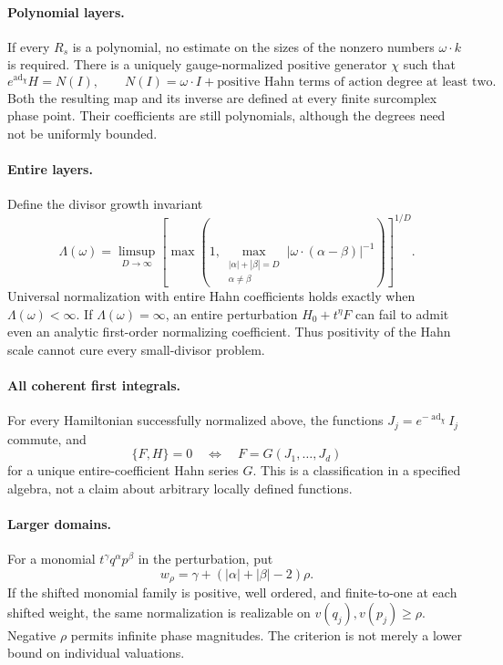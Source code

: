 \documentclass[11pt,letterpaper]{article}
\numberwithin{equation}{section}
\theoremstyle{definition}
\theoremstyle{remark}
\newcommand{\ad}{\operatorname{ad}}
\begin{document}
\paragraph{Polynomial layers.}
If every $R_s$ is a polynomial, no estimate on the sizes of the nonzero
numbers $\omega\cdot k$ is required. There is a uniquely gauge-normalized
positive generator $\chi$ such that
\[
 e^{\ad_\chi}H=N(I),\qquad
 N(I)=\omega\cdot I+\text{positive Hahn terms of action degree at least two}.
\]
Both the resulting map and its inverse are defined at every finite
surcomplex phase point. Their coefficients are still polynomials, although
the degrees need not be uniformly bounded.

\paragraph{Entire layers.}
Define the divisor growth invariant
\begin{equation}\label{eq:Lambdaintro}
 \Lambda(\omega)=\limsup_{D\to\infty}
 \left[\max\left(1,
 \max_{\substack{|\alpha|+|\beta|=D\\\alpha\ne\beta}}
 |\omega\cdot(\alpha-\beta)|^{-1}\right)\right]^{1/D}.
\end{equation}
Universal normalization with entire Hahn coefficients holds exactly when
$\Lambda(\omega)<\infty$. If $\Lambda(\omega)=\infty$, an entire perturbation
$H_0+t^\eta F$ can fail to admit even an analytic first-order normalizing
coefficient. Thus positivity of the Hahn scale cannot cure every
small-divisor problem.

\paragraph{All coherent first integrals.}
For every Hamiltonian successfully normalized above, the functions
$J_j=e^{-\ad_\chi}I_j$ commute, and
\[
 \{F,H\}=0
 \quad\Longleftrightarrow\quad
 F=G(J_1,\ldots,J_d)
\]
for a unique entire-coefficient Hahn series $G$. This is a classification in
a specified algebra, not a claim about arbitrary locally defined functions.

\paragraph{Larger domains.}
For a monomial $t^\gamma q^\alpha p^\beta$ in the perturbation, put
\[
 w_\rho=\gamma+(|\alpha|+|\beta|-2)\rho.
\]
If the shifted monomial family is positive, well ordered, and finite-to-one
at each shifted weight, the same normalization is realizable on
$v(q_j),v(p_j)\ge\rho$. Negative $\rho$ permits infinite phase magnitudes.
The criterion is not merely a lower bound on individual valuations.
\end{document}
